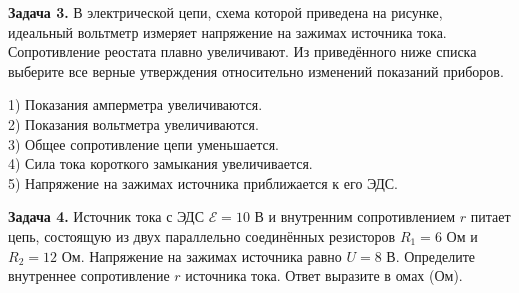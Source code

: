 \begin{taskbasic}[code={\label{task:elem_circ_v25_n14}}]
\textbf{Задача 3.} В электрической цепи, схема которой приведена на рисунке, идеальный вольтметр измеряет напряжение на зажимах источника тока. Сопротивление реостата плавно увеличивают. Из приведённого ниже списка выберите все верные утверждения относительно изменений показаний приборов.

\nopagebreak\smallskip
\begin{center}
\end{center}

1) Показания амперметра увеличиваются.\\
2) Показания вольтметра увеличиваются.\\
3) Общее сопротивление цепи уменьшается.\\
4) Сила тока короткого замыкания увеличивается.\\
5) Напряжение на зажимах источника приближается к его ЭДС.

\end{taskbasic}

\begin{taskbasic}[code={\label{task:elem_circ_v26_n25}}]
\textbf{Задача 4.} Источник тока с ЭДС $\mathcal{E} = 10\text{ В}$ и внутренним сопротивлением $r$ питает цепь, состоящую из двух параллельно соединённых резисторов $R_1 = 6\text{ Ом}$ и $R_2 = 12\text{ Ом}$. Напряжение на зажимах источника равно $U = 8\text{ В}$. Определите внутреннее сопротивление $r$ источника тока. Ответ выразите в омах (Ом).

\end{taskbasic}

